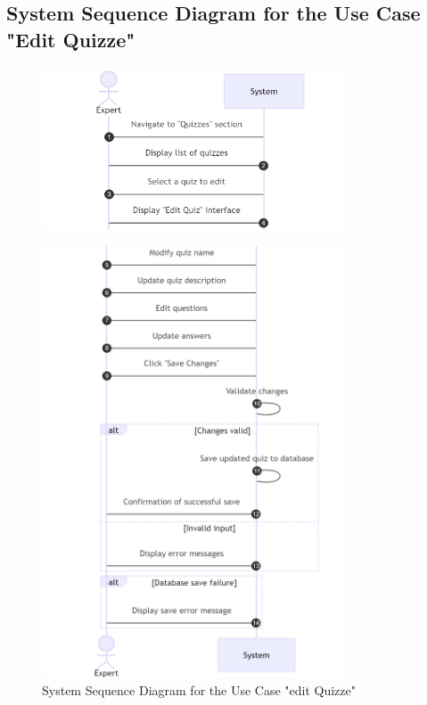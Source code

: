\newpage

\subsection{System Sequence Diagram for the Use Case "Edit Quizze"}

\begin{figure}[h!]
    \centering*
    \includegraphics[width=0.8\textwidth]{images/diagram quizz.png}
\end{figure}

\begin{figure}[h!]
    \centering*
    \includegraphics[width=0.8\textwidth]{images/diagram quizz2.png}
    \caption{System Sequence Diagram for the Use Case "edit Quizze"}
    \label{fig:System Sequence Diagram for the Use Case "edit Quizze"}
\end{figure}
\newpage
